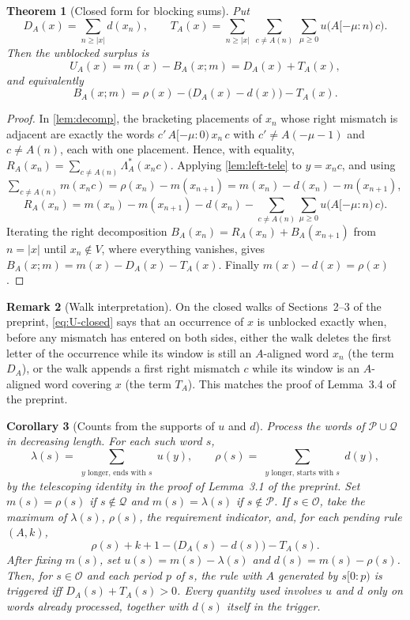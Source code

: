 \documentclass[11pt]{article}
\numberwithin{equation}{section}
\newtheorem{theorem}{Theorem}[section]
\newtheorem{corollary}[theorem]{Corollary}
\theoremstyle{definition}
\newtheorem{remark}[theorem]{Remark}
\newcommand{\len}[1]{\lvert #1\rvert}
\newcommand{\Pre}{\mathcal P}
\newcommand{\Suf}{\mathcal Q}
\newcommand{\Ov}{\mathcal O}
\begin{document}
\begin{theorem}[Closed form for blocking sums]\label{thm:closed}
Put
\[
D_A(x)=\sum_{n\ge\len x}d(x_n),\qquad
T_A(x)=\sum_{n\ge\len x}\ \sum_{c\ne A(n)}\ \sum_{\mu\ge0}
u\bigl(A[-\mu:n)\,c\bigr).
\]
Then the unblocked surplus is
\begin{equation}\label{eq:U-closed}
U_A(x)=m(x)-B_A(x;m)=D_A(x)+T_A(x),
\end{equation}
and equivalently
\begin{equation}\label{eq:B-closed}
B_A(x;m)=\rho(x)-\bigl(D_A(x)-d(x)\bigr)-T_A(x).
\end{equation}
\end{theorem}

\begin{proof}
In \cref{lem:decomp}, the bracketing placements of $x_n$ whose right mismatch
is adjacent are exactly the words $c'\,A[-\mu:0)\,x_n\,c$ with
$c'\ne A(-\mu-1)$ and $c\ne A(n)$, each with one placement. Hence, with
equality, $R_A(x_n)=\sum_{c\ne A(n)}\Lambda^*_A(x_n c)$. Applying
\cref{lem:left-tele} to $y=x_nc$, and using
$\sum_{c\ne A(n)}m(x_nc)=\rho(x_n)-m(x_{n+1})=m(x_n)-d(x_n)-m(x_{n+1})$,
\[
R_A(x_n)=m(x_n)-m(x_{n+1})-d(x_n)
-\sum_{c\ne A(n)}\sum_{\mu\ge0}u\bigl(A[-\mu:n)\,c\bigr).
\]
Iterating the right decomposition $B_A(x_n)=R_A(x_n)+B_A(x_{n+1})$ from
$n=\len x$ until $x_n\notin V$, where everything vanishes, gives
$B_A(x;m)=m(x)-D_A(x)-T_A(x)$. Finally $m(x)-d(x)=\rho(x)$.
\end{proof}

\begin{remark}[Walk interpretation]
On the closed walks of Sections~2--3 of the preprint, \eqref{eq:U-closed} says
that an occurrence of $x$ is unblocked exactly when, before any mismatch has entered on both
sides, either the walk deletes the first letter of the occurrence while its
window is still an $A$-aligned word $x_n$ (the term $D_A$), or the walk
appends a first right mismatch $c$ while its window is an $A$-aligned word
covering $x$ (the term $T_A$). This matches the proof of Lemma~3.4 of the
preprint.
\end{remark}

\begin{corollary}[Counts from the supports of $u$ and $d$]\label{cor:uv-only}
Process the words of $\Pre\cup\Suf$ in decreasing length. For each such word $s$,
\[
\lambda(s)=\sum_{\substack{y\text{ longer, ends with }s}}u(y),\qquad
\rho(s)=\sum_{\substack{y\text{ longer, starts with }s}}d(y),
\]
by the telescoping identity in the proof of Lemma~3.1 of the preprint. Set $m(s)=\rho(s)$ if
$s\notin\Suf$ and $m(s)=\lambda(s)$ if $s\notin\Pre$. If $s\in\Ov$, take the maximum of
$\lambda(s)$, $\rho(s)$, the requirement indicator, and, for each pending rule $(A,k)$,
\[
\rho(s)+k+1-\bigl(D_A(s)-d(s)\bigr)-T_A(s).
\]
After fixing $m(s)$, set $u(s)=m(s)-\lambda(s)$ and $d(s)=m(s)-\rho(s)$. Then, for
$s\in\Ov$ and each period $p$ of $s$, the rule with $A$ generated by
$s[0:p)$ is triggered iff $D_A(s)+T_A(s)>0$. Every quantity used involves
$u$ and $d$ only on words already processed, together with $d(s)$ itself in
the trigger.
\end{corollary}
\end{document}
